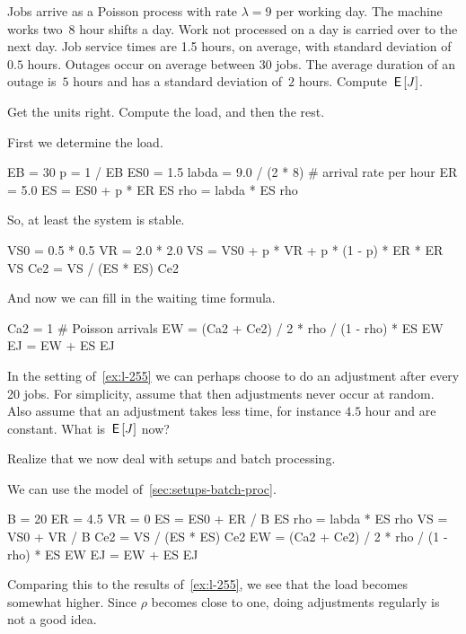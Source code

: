 \documentclass[queueing-book.tex]{subfiles}
\begin{document}
\begin{exercise}\label{ex:l-255}
Jobs arrive as a Poisson process with rate $\lambda=9$ per working day.
The machine works two~$8$ hour shifts a day.
Work not processed on a day is carried over to the next day.
Job service times are 1.5 hours, on average, with standard deviation of $0.5$ hours.
Outages occur on average between $30$ jobs.
The average duration of an outage is~$5$ hours and has a standard deviation of~$2$ hours.
Compute $\,\mathsf{E}\left[J\right]$.
\begin{hint}
 Get the units right.  Compute the load, and then the rest.
\end{hint}
\begin{solution}
First we determine the load.
\begin{pyconsole}
EB = 30
p = 1 / EB
ES0 = 1.5
labda = 9.0 / (2 * 8)  # arrival rate per hour
ER = 5.0
ES = ES0 + p * ER
ES
rho = labda * ES
rho
\end{pyconsole}
So, at least the system is stable.
\begin{pyconsole}
VS0 = 0.5 * 0.5
VR = 2.0 * 2.0
VS = VS0 + p * VR + p * (1 - p) * ER * ER
VS
Ce2 = VS / (ES * ES)
Ce2
\end{pyconsole}
And now we can fill in the waiting time formula.
\begin{pyconsole}
Ca2 = 1  # Poisson arrivals
EW = (Ca2 + Ce2) / 2 * rho / (1 - rho) * ES
EW
EJ = EW + ES
EJ
\end{pyconsole}
\end{solution}
\end{exercise}


\begin{exercise}\label{ex:104}
In the setting of~\cref{ex:l-255} we can perhaps choose to do an adjustment after every 20 jobs.
For simplicity, assume that then adjustments never occur at random.
Also assume that an adjustment takes less time, for instance $4.5$ hour and are constant.
What is $\,\mathsf{E}\left[J\right]$ now?
\begin{hint}
Realize that we now deal with setups and batch processing.
\end{hint}
\begin{solution}
We can use the model of~\cref{sec:setups-batch-proc}.
\begin{pyconsole}
B = 20
ER = 4.5
VR = 0
ES = ES0 + ER / B
ES
rho = labda * ES
rho
VS = VS0 + VR / B
Ce2 = VS / (ES * ES)
Ce2
EW = (Ca2 + Ce2) / 2 * rho / (1 - rho) * ES
EW
EJ = EW + ES
EJ
\end{pyconsole}
Comparing this to the results of~\cref{ex:l-255}, we see that the load becomes somewhat higher. Since $\rho$ becomes close to one, doing adjustments regularly is not a good idea.
\end{solution}
\end{exercise}
\end{document}
